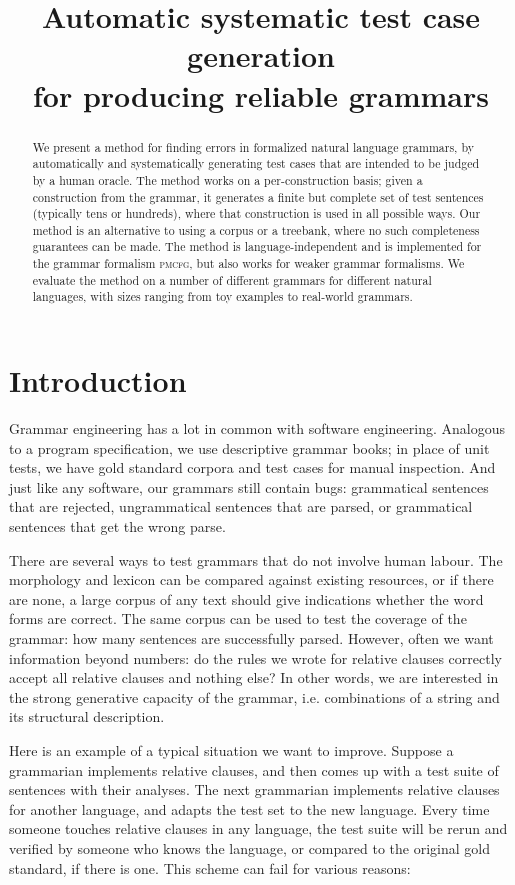 \documentclass[11pt]{article}
\title{Automatic systematic test case generation\\for producing reliable grammars}
\date{}
\def\pmcfg{\textsc{pmcfg}}
\begin{document}
\maketitle
\begin{abstract}
We present a method for finding errors in formalized natural language grammars, by automatically and systematically generating test cases that are intended to be judged by a human oracle. The method works on a per-construction basis; given a construction from the grammar, it generates a finite but complete set of test sentences (typically tens or hundreds), where that construction is used in all possible ways. Our method is an alternative to using a corpus or a treebank, where no such completeness guarantees can be made. The method is language-independent and is implemented for the grammar formalism \pmcfg{}, but also works for weaker grammar formalisms. We evaluate the method on a number of different grammars for different natural languages, with sizes ranging from toy examples to real-world grammars.
\end{abstract}

\section{Introduction}

Grammar engineering has a lot in common with software
engineering. Analogous to a program specification, we use
descriptive grammar books; in place of unit tests, we have gold
standard corpora and test cases for manual inspection.
And just like any software, our grammars still contain bugs:
grammatical sentences that are rejected, ungrammatical
sentences that are parsed, or grammatical sentences that get the wrong
parse.

There are several ways to test grammars that do not involve human
labour. The morphology and lexicon can be compared against existing resources, or
if there are none, a large corpus of any text should give indications
whether the word forms are correct. The same corpus can be used to
test the coverage of the grammar: how many sentences are successfully parsed.
However, often we want information beyond numbers: do the rules we
wrote for relative clauses correctly accept all relative clauses and
nothing else? In other words, we are interested in the strong
generative capacity \cite{chomsky1963} of the grammar, i.e. combinations
of a string and its structural description.

Here is an example of a typical situation we want to improve. Suppose a
grammarian implements relative clauses, and then comes up with a test
suite of sentences with their analyses. The next grammarian implements
relative clauses for another language, and adapts the test set to the
new language. Every time someone touches relative clauses 
in any language, the test suite will be rerun and verified by
someone who knows the language, or compared to the original gold standard, 
if there is one. This scheme can fail for various reasons: 
\end{document}
